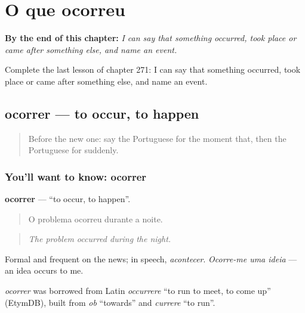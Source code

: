 
\chapter{O que ocorreu}
\label{ch:pt-o-que-ocorreu}

\begin{chapteropening}
\textbf{By the end of this chapter:} \emph{I can say that something occurred, took place or came after something else, and name an event.}

Complete the last lesson of chapter 271: I can say that something occurred, took place or came after something else, and name an event.
\end{chapteropening}

\section[ocorrer]{ocorrer — to occur, to happen}

\label{lesson:PT-C271-ocorrer}



\begin{quote}
Before the new one: say the Portuguese for the moment that, then the Portuguese for suddenly.
\end{quote}

\subsection*{You'll want to know: ocorrer}
\textbf{ocorrer} — \textquotedblleft{}to occur, to happen\textquotedblright{}.

\begin{quote}
O problema ocorreu durante a noite.
\end{quote}

\begin{quote}
\emph{The problem occurred during the night.}
\end{quote}

Formal and frequent on the news; in speech, \emph{acontecer}. \emph{Ocorre-me uma ideia} — an idea occurs to me.

\begin{cousinweb}
\emph{ocorrer} was borrowed from Latin \emph{occurrere} \textquotedblleft{}to run to meet, to come up\textquotedblright{} (EtymDB), built from \emph{ob} \textquotedblleft{}towards\textquotedblright{} and \emph{currere} \textquotedblleft{}to run\textquotedblright{}.
\end{cousinweb}

